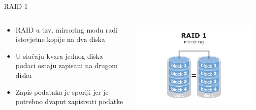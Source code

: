 \documentclass[croatian,t]{beamer} %
\begin{document}
    \begin{frame}{RAID 1}
    	\begin{columns}[c]
    		\begin{column}{6cm}
    			\begin{itemize}
    				\item RAID u tzv. mirroring modu radi istovjetne kopije na dva diska
   					\item U slučaju kvara jednog diska podaci ostaju zapisani na drugom disku
   					\item Zapis podataka je sporiji jer je potrebno dvaput zapisivati podatke
    			\end{itemize}
    		\end{column}
    		\begin{column}{5cm}
    			\includegraphics[width=1.2\textwidth]{../pics/raid1.png}
    		\end{column}
    	\end{columns}
    \end{frame}
    
\end{document}
